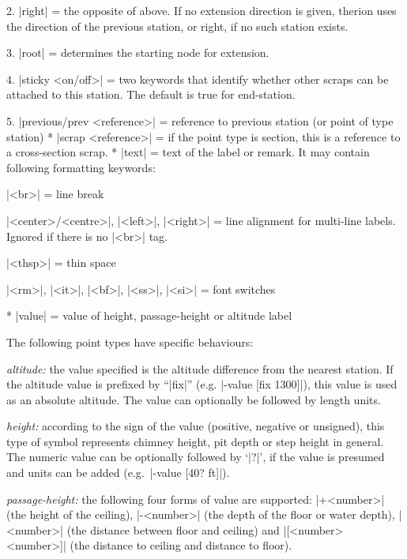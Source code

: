     2. |right| = the opposite of above. If no extension direction is
       given, therion uses the direction of the previous station, or
       right, if no such station exists.

    3. |root| = determines the starting node for extension.

    4. |sticky <on/off>| = two keywords that identify whether other
       scraps can be attached to this station. The default is true for
       end-station.

    5. |previous/prev <reference>| = reference to previous station
       (or point of type station)
  * |scrap <reference>| = if the point type is section, this is a 
    reference to a cross-section scrap. 
  * |text| = text of the label or remark. It may contain following formatting
    keywords:
    
    |<br>| = line break
    
    |<center>/<centre>|, |<left>|, |<right>| = line alignment for multi-line labels. 
    Ignored if there is no |<br>| tag.
    
    |<thsp>| = thin space
    
    |<rm>|, |<it>|, |<bf>|, |<ss>|, |<si>| = font switches
        
  * |value| = value of height, passage-height or altitude label
\endoptions

\notes
   The following point types have specific behaviours:
        
   \list
      {\it altitude:} the value specified is the altitude difference from 
      the nearest station. If the altitude value is prefixed by ``|fix|''
      (e.g. |-value [fix 1300]|), this value is used as an absolute altitude. 
      The value can optionally be followed by length units.
        
      {\it height:} according to the sign of the value (positive, negative or
      unsigned), this type of symbol represents chimney height, pit depth
      or step height in general. The numeric value can be optionally followed by `|?|', 
      if the value is presumed and units can be added 
      (e.g.~|-value [40? ft]|).
        
      {\it passage-height:} the following four forms of value are supported:
      |+<number>| (the height of the ceiling), |-<number>| (the depth of the 
      floor or water depth), |<number>| (the distance between floor 
      and ceiling) and |[<number> <number>]| (the distance to ceiling and 
      distance to floor).
        
